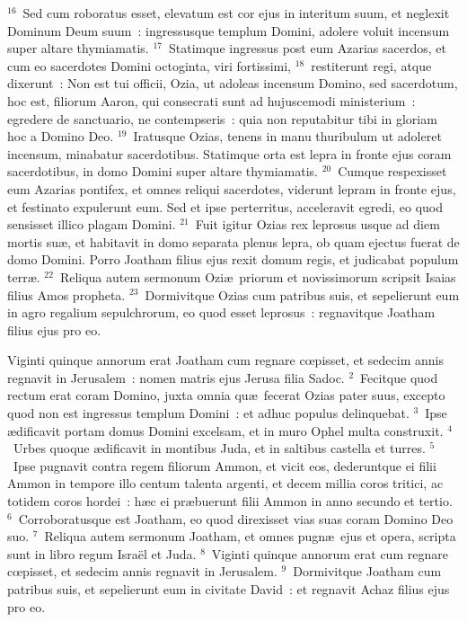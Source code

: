 ${}^{16}$~Sed cum roboratus esset, elevatum est cor ejus in interitum suum, et neglexit Dominum Deum suum~: ingressusque templum Domini, adolere voluit incensum super altare thymiamatis.
${}^{17}$~Statimque ingressus post eum Azarias sacerdos, et cum eo sacerdotes Domini octoginta, viri fortissimi,
${}^{18}$~restiterunt regi, atque dixerunt~: Non est tui officii, Ozia, ut adoleas incensum Domino, sed sacerdotum, hoc est, filiorum Aaron, qui consecrati sunt ad hujuscemodi ministerium~: egredere de sanctuario, ne contempseris~: quia non reputabitur tibi in gloriam hoc a Domino Deo.
${}^{19}$~Iratusque Ozias, tenens in manu thuribulum ut adoleret incensum, minabatur sacerdotibus. Statimque orta est lepra in fronte ejus coram sacerdotibus, in domo Domini super altare thymiamatis.
${}^{20}$~Cumque respexisset eum Azarias pontifex, et omnes reliqui sacerdotes, viderunt lepram in fronte ejus, et festinato expulerunt eum. Sed et ipse perterritus, acceleravit egredi, eo quod sensisset illico plagam Domini.
${}^{21}$~Fuit igitur Ozias rex leprosus usque ad diem mortis su\ae , et habitavit in domo separata plenus lepra, ob quam ejectus fuerat de domo Domini. Porro Joatham filius ejus rexit domum regis, et judicabat populum terr\ae .
${}^{22}$~Reliqua autem sermonum Ozi\ae\ priorum et novissimorum scripsit Isaias filius Amos propheta.
${}^{23}$~Dormivitque Ozias cum patribus suis, et sepelierunt eum in agro regalium sepulchrorum, eo quod esset leprosus~: regnavitque Joatham filius ejus pro eo.

\lettrine[lines=10,image=true,loversize=0.05,lraise=-0.03]{V}{}iginti quinque annorum erat Joatham cum regnare cœpisset, et sedecim annis regnavit in Jerusalem~: nomen matris ejus Jerusa filia Sadoc.
${}^{2}$~Fecitque quod rectum erat coram Domino, juxta omnia qu\ae\ fecerat Ozias pater suus, excepto quod non est ingressus templum Domini~: et adhuc populus delinquebat.
${}^{3}$~Ipse \ae dificavit portam domus Domini excelsam, et in muro Ophel multa construxit.
${}^{4}$~Urbes quoque \ae dificavit in montibus Juda, et in saltibus castella et turres.
${}^{5}$~Ipse pugnavit contra regem filiorum Ammon, et vicit eos, dederuntque ei filii Ammon in tempore illo centum talenta argenti, et decem millia coros tritici, ac totidem coros hordei~: h\ae c ei pr\ae buerunt filii Ammon in anno secundo et tertio.
${}^{6}$~Corroboratusque est Joatham, eo quod direxisset vias suas coram Domino Deo suo.
${}^{7}$~Reliqua autem sermonum Joatham, et omnes pugn\ae\ ejus et opera, scripta sunt in libro regum Isra\"el et Juda.
${}^{8}$~Viginti quinque annorum erat cum regnare cœpisset, et sedecim annis regnavit in Jerusalem.
${}^{9}$~Dormivitque Joatham cum patribus suis, et sepelierunt eum in civitate David~: et regnavit Achaz filius ejus pro eo.

